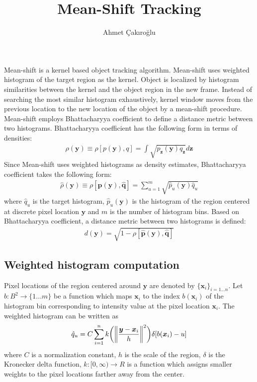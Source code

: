 \documentclass{article}
\title{Mean-Shift Tracking}
\author{Ahmet Çakıroğlu}
\date{}
\begin{document}
\maketitle


Mean-shift is a kernel based object tracking algorithm. Mean-shift uses weighted histogram of the target region as the kernel. Object is localized by histogram similarities between the kernel and the object region in the new frame. Instead of searching the most similar histogram exhaustively, kernel window moves from the previous location to the new location of the object by a mean-shift procedure. Mean-shift employs Bhattacharyya coefficient to define a distance metric between two histograms. Bhattacharyya coefficient has the following form in terms of densities:
\begin{gather}
\rho(\boldsymbol{y})\equiv\rho[p(\boldsymbol{y}),q]=\int\sqrt{p_{\boldsymbol{z}}(\boldsymbol{y})q_{\boldsymbol{z}}}d\boldsymbol{z}
\end{gather}
Since Mean-shift uses weighted histograms as density estimates, Bhattacharyya coefficient takes the following form:
\begin{gather}
\hat{\rho}(\boldsymbol{y})\equiv\rho[\hat{\textbf{p}}(\boldsymbol{y}),\hat{\textbf{q}}]=\sum_{u=1}^m\sqrt{\hat{p}_{u}(\boldsymbol{y})\hat{q}_{u}}
\end{gather}
where $\hat{q}_{u}$ is the target histogram, $\hat{p}_{u}(\boldsymbol{y})$ is the histogram of the region centered at discrete pixel location $\textbf{y}$ and $m$ is the number of histogram bins. Based on Bhattacharyya coefficient, a distance metric between two histograms is defined:
\begin{gather}
d(\boldsymbol{y}) = \sqrt{1-\rho[\hat{\textbf{p}}(\boldsymbol{y}),\hat{\textbf{q}}]}
\end{gather}

\subsection*{Weighted histogram computation}
Pixel locations of the region centered around $\boldsymbol{y}$ are denoted by $\{{\boldsymbol{x}_i}\}_{i=1...n}$. Let $b:B^2\rightarrow \{1...m\}$ be a function which maps $\boldsymbol{x}_i$ to the index $b(\boldsymbol{x}_i)$ of the histogram bin corresponding to intensity value at the pixel location $\boldsymbol{x}_i$. The weighted histogram can be written as
\begin{gather}
\hat{q}_{u} = C \sum_{i=1}^n k\bigg{(}\bigg{\|}\frac{\boldsymbol{y}-\boldsymbol{x}_i}{h}\bigg{\|}^2\bigg{)}\delta[b(\boldsymbol{x}_i)-u]
\end{gather}
where $C$ is a normalization constant, $h$ is the scale of the region, $\delta$ is the Kronecker delta function, $k:[0,\infty)\rightarrow R$ is a function which assigns smaller weights to the pixel locations farther away from the center.
\end{document}
